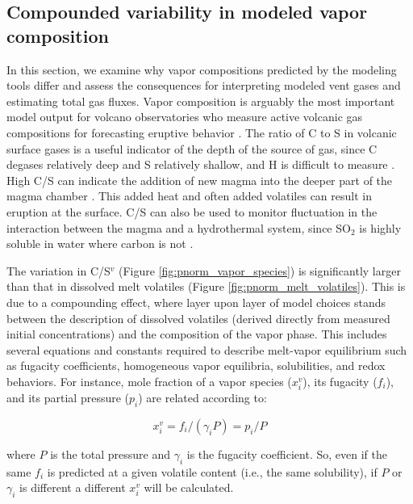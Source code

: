 \documentclass[draft, english]{volcanica-template}
\begin{document}
\subsection{Compounded variability in modeled vapor composition}
\label{sec:vaporcompositiondiscussion}
In this section, we examine why vapor compositions predicted by the modeling tools differ and assess the consequences for interpreting modeled vent gases and estimating total gas fluxes. Vapor composition is arguably the most important model output for volcano observatories who measure active volcanic gas compositions for forecasting eruptive behavior \parencite{Aiuppa2007,demoor2016turmoil,Kern2022}. The ratio of C to S in volcanic surface gases is a useful indicator of the depth of the source of gas, since C degases relatively deep and S relatively shallow, and H is difficult to measure \parencite{Aiuppa2007,demoor2016turmoil,Ding2025,Giggenbach1996,iacovino2015,Kern2022,burton2007role}. High C/S can indicate the addition of new magma into the deeper part of the magma chamber \parencite{Ding2025,Aiuppa2007,demoor2016turmoil}. This added heat and often added volatiles can result in eruption at the surface. C/S can also be used to monitor fluctuation in the interaction between the magma and a hydrothermal system, since SO$_2$ is highly soluble in water where carbon is not \parencite{deMoor2016short,stix2018understanding,demoor2016turmoil}.

The variation in C/S$^v$ (Figure \ref{fig:pnorm_vapor_species}) is significantly larger than that in dissolved melt volatiles (Figure \ref{fig:pnorm_melt_volatiles}). This is due to a compounding effect, where layer upon layer of model choices stands between the description of dissolved volatiles (derived directly from measured initial concentrations) and the composition of the vapor phase. This includes several equations and constants required to describe melt-vapor equilibrium such as fugacity coefficients, homogeneous vapor equilibria, solubilities, and redox behaviors. For instance, mole fraction of a vapor species ($x^v_i$), its fugacity ($f_i$), and its partial pressure ($p_i$) are related according to:

\begin{equation} 
    x^v_i=f_i/(\gamma_iP)=p_i/P
    \label{eq:P-f-y}
\end{equation}

\noindent where $P$ is the total pressure and $\gamma_i$ is the fugacity coefficient. So, even if the same $f_i$ is predicted at a given volatile content (i.e., the same solubility), if $P$ or $\gamma_i$ is different a different $x^v_i$ will be calculated. 
\end{document}
